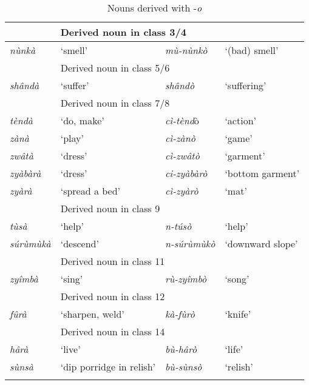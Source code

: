 \begin{table}
\label{bkm:Ref98855579}\caption{\label{tab:4:12}Nouns derived with -\textit{o}}
\begin{tabular}{llll}
\lsptoprule
\multicolumn{2}{l}{Base verb} & \multicolumn{2}{l}{Derived noun in class 3/4}\\
\midrule
\textit{nùnkà} & ‘smell’ & \textit{mù-nùnkò} & ‘(bad) smell’\\
\tablevspace
\multicolumn{2}{l}{} & \multicolumn{2}{l}{Derived noun in class 5/6}\\
\midrule
\textit{shândà} & ‘suffer’ & \textit{shândò} & ‘suffering’\\
\tablevspace
\multicolumn{2}{l}{} & \multicolumn{2}{l}{Derived noun in class 7/8}\\
\midrule
\textit{tèndà} & ‘do, make’ & \textit{cì-tènd}ò & ‘action’\\
\textit{zànà} & ‘play’ & \textit{cì-zànò} & ‘game’\\
\textit{zwâtà} & ‘dress’ & \textit{cì-zwâtò} & ‘garment’\\
\textit{zyàbàrà} & ‘dress’ & \textit{ci-zyàbàrò} & ‘bottom garment’\\
\textit{zyàrà} & ‘spread a bed’ & \textit{cì-zyàrò} & ‘mat’\\
\tablevspace
\multicolumn{2}{l}{} & \multicolumn{2}{l}{Derived noun in class 9}\\
\midrule
\textit{tùsà} & ‘help’ & \textit{n-túsò} & ‘help’\\
\textit{súrùmùkà} & ‘descend’ & \textit{n-súrùmùkò} & ‘downward slope’\\
\tablevspace
\multicolumn{2}{l}{} & \multicolumn{2}{l}{Derived noun in class 11}\\
\midrule
\textit{zyîmbà} & ‘sing’ & \textit{rù-zyîmbò} & ‘song’\\
\tablevspace
\multicolumn{2}{l}{} & \multicolumn{2}{l}{Derived noun in class 12}\\
\midrule
\textit{fûrà} & ‘sharpen, weld’ & \textit{kà-fùrò} & ‘knife’\\
\tablevspace
\multicolumn{2}{l}{} & \multicolumn{2}{l}{Derived noun in class 14}\\
\midrule
\textit{hârà} & ‘live’ & \textit{bù-hârò} & ‘life’\\
\textit{sùnsà} & ‘dip porridge in relish’ & \textit{bù-sùnsò} & ‘relish’\\
\lspbottomrule
\end{tabular}
\end{table}

